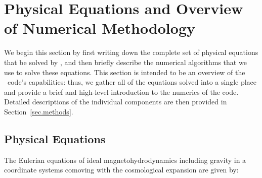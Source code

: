 

\section{Physical Equations and Overview of Numerical Methodology}
\label{sec.overview}

We begin this section by first writing down the complete set of
physical equations that be solved by \enzo, and then briefly describe
the numerical algorithms that we use to solve these equations.  This
section is intended to be an overview of the \enzo\ code's
capabilities: thus, we gather all of the equations solved into a
single place and provide a brief and high-level introduction to the
numerics of the code.  Detailed descriptions of the individual
components are then provided in Section~\ref{sec.methods}.


\subsection{Physical Equations}
\label{sec.equations}



The Eulerian equations of ideal magnetohydrodynamics including gravity
in a coordinate systems comoving with the cosmological expansion are
given by:

